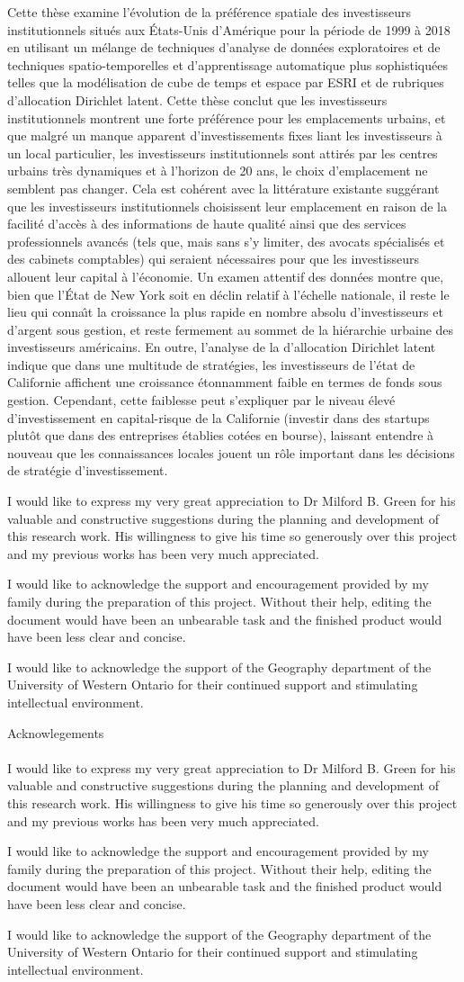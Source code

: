 \documentclass[12pt,twoside]{report}
\makeatletter
\numberwithin{figure}{chapter}
\newenvironment{preliminary}%
{\pagestyle{plain}\pagenumbering{roman}}%
{\pagenumbering{arabic}}
\newcommand\acknowlege[1]{%
  \edef\@tempa{#1}%
  \def\@tempb{}%
  \ifx\@tempa\@tempb
	\else \newpage \Large Acknowlegements\normalsize\\\indent\\#1\newpage
  \fi
}
\newcommand{\makeacknowlege} {
	I would like to express my very great appreciation to Dr Milford B. Green for his valuable and constructive suggestions during the planning and development of this research work. His willingness to give his time so generously over this project and my previous works has been very much appreciated. \newline
	
	I would like to acknowledge the support and encouragement provided by my family during the preparation of this project. Without their help, editing the document would have been an unbearable task and the finished product would have been less clear and concise.     
	
	I would like to acknowledge the support of the Geography department of the University of Western Ontario for their continued support and stimulating intellectual environment.     
}
\makeatother
\begin{document}
\begin{preliminary}
\begin{spacing}{2}
	Cette th\`{e}se examine l'\'{e}volution de la pr\'{e}f\'{e}rence spatiale des investisseurs institutionnels situ\'{e}s aux \'{E}tats-Unis d'Am\'{e}rique pour la p\'{e}riode de 1999 \`{a} 2018 en utilisant un m\'{e}lange de techniques d'analyse de donn\'{e}es exploratoires et de techniques spatio-temporelles et d'apprentissage automatique plus sophistiqu\'{e}es telles que la mod\'{e}lisation de cube de temps et espace par ESRI et de rubriques d'allocation Dirichlet latent. Cette th\`{e}se conclut que les investisseurs institutionnels montrent une forte pr\'{e}f\'{e}rence pour les emplacements urbains, et que malgr\'{e} un manque apparent d'investissements fixes liant les investisseurs \`{a} un local particulier, les investisseurs institutionnels sont attir\'{e}s par les centres urbains tr\`{e}s dynamiques et \`{a} l'horizon de 20 ans, le choix d'emplacement ne semblent pas changer. Cela est coh\'{e}rent avec la litt\'{e}rature existante sugg\'{e}rant que les investisseurs institutionnels choisissent leur emplacement en raison de la facilit\'{e} d'acc\`{e}s \`{a} des informations de haute qualit\'{e} ainsi que des services professionnels avanc\'{e}s (tels que, mais sans s'y limiter, des avocats sp\'{e}cialis\'{e}s et des cabinets comptables) qui seraient n\'{e}cessaires pour que les investisseurs allouent leur capital \`{a} l'\'{e}conomie. Un examen attentif des donn\'{e}es montre que, bien que l'\'{E}tat de New York soit en d\'{e}clin relatif \`{a} l'\'{e}chelle nationale, il reste le lieu qui conna\^{\i}t la croissance la plus rapide en nombre absolu d'investisseurs et d'argent sous gestion, et reste fermement au sommet de la hi\'{e}rarchie urbaine des investisseurs am\'{e}ricains. En outre, l'analyse de la d'allocation Dirichlet latent indique que dans une multitude de strat\'{e}gies, les investisseurs de l'\'{e}tat de Californie affichent une croissance \'{e}tonnamment faible en termes de fonds sous gestion. Cependant, cette faiblesse peut s'expliquer par le niveau \'{e}lev\'{e} d'investissement en capital-risque de la Californie (investir dans des startups plut\^{o}t que dans des entreprises \'{e}tablies cot\'{e}es en bourse), laissant entendre \`{a} nouveau que les connaissances locales jouent un r\^{o}le important dans les d\'{e}cisions de strat\'{e}gie d'investissement.
	
	
\end{spacing}

\begin{spacing}{1.5}
\acknowlege{\makeacknowlege}
\printnomenclature[1.75in]	
\tableofcontents\newpage
\newpage
{}
\listoffigures
\newpage
{}
\listoftables\newpage

\end{spacing}
\end{preliminary}
\end{document}
